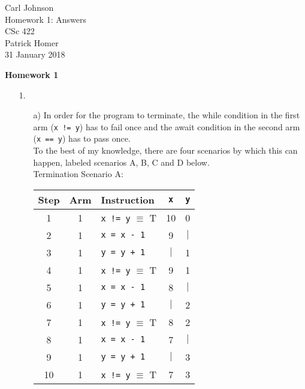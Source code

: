 \documentclass[11pt]{article}
\newcommand{\code}[1]{\texttt{#1}}
\begin{document}
\pagestyle{plain}

Carl Johnson\\
Homework 1: Answers\\
CSc 422\\
Patrick Homer\\
31 January 2018

\begin{center}
\textbf{Homework 1}
\end{center}

\begin{enumerate}
\item [1.] 

	\begin{enumerate}
	\item[a)] \hspace{0.8cm}In order for the program to terminate, the while condition in the first arm (\code{x != y}) has to fail once and the await condition in the second arm (\code{x == y}) has to pass once.\\
	\hspace{0.8cm}To the best of my knowledge, there are four scenarios by which this can happen, labeled scenarios A, B, C and D below.\\
	
	Termination Scenario A: \\
	
	\begin{tabular}{c |c | l | c | c }
		Step & Arm & Instruction	&	\code{x}	&  \code{y}	\\
		\hline
		1 	& 1 & \code{x != y} $\equiv$ T	&	10	&	0\\
		2 	& 1 & \code{x = x - 1}			&	9	&	$|$\\
		3 	& 1 & \code{y = y + 1}			&	$|$	&	1\\
		4 	& 1 & \code{x != y} $\equiv$ T	&	9	&	1\\
		5 	& 1 & \code{x = x - 1}			&	8	&	$|$\\
		6 	& 1 & \code{y = y + 1}			&	$|$	&	2\\
		7 	& 1 & \code{x != y} $\equiv$ T	&	8	&	2\\
		8 	& 1 & \code{x = x - 1}			&	7	&	$|$\\
		9 	& 1 & \code{y = y + 1}			&	$|$	&	3\\
		10 	& 1 & \code{x != y} $\equiv$ T	&	7	&	3\\
		

\end{tabular}
\end{enumerate}
\end{enumerate}
\end{document}
